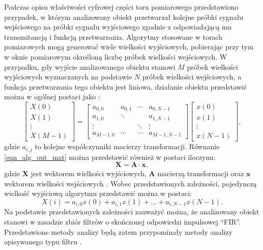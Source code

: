 Podczas opisu właściwości cyfrowej części toru pomiarowego przedstawiono przypadek, w którym analizowany obiekt przetwarzał kolejne próbki sygnału wejściowego na próbki sygnału wyjściowego zgodnie z odpowiadającą mu transmitancją i funkcją przetwarzania. Algorytmy stosowane w torach pomiarowych mogą generować wiele wielkości wyjściowych, pobierając przy tym w oknie pomiarowym określoną liczbę próbek wielkości wejściowych. W przypadku, gdy wyjście analizowanego obiektu stanowi $M$ próbek wielkości wyjściowych wyznaczanych na podstawie $N$ próbek wielkości wejściowych, a funkcja przetwarzania tego obiektu jest liniowa, działanie obiektu przedstawić można w ogólnej postaci jako \cite{jakubiec_algorithms, jakubiec_single}:
\begin{equation}
\begin{bmatrix}
X \left( 0 \right)   \\
X \left( 1 \right)   \\
\vdots               \\
X \left( M-1 \right)
\end{bmatrix}
=
\begin{bmatrix}
a_{0, 0}   &   a_{0, 1} &   \cdots   &   a_{0, N-1}      \\
a_{1, 0}   &   \ddots   &            &   a_{1, N-1}      \\
\vdots     &            &   \ddots   &   \vdots          \\
a_{M-1, 0} &   \cdots   &   \cdots   &   a_{M-1, N-1}
\end{bmatrix}
\begin{bmatrix}
x \left( 0 \right)   \\
x \left( 1 \right)   \\
\vdots               \\
x \left( N-1 \right)
\end{bmatrix}
\label{eqn_alg_out_mat},
\end{equation}
gdzie $a_{i,j}$ to kolejne współczynniki macierzy transformacji. Równanie \eqref{eqn_alg_out_mat} można przedstawić również w postaci iloczynu:
\begin{equation}
\mathbf{X} = \mathbf{A} \cdot \mathbf{x} \label{eqn_alg_out_mul},
\end{equation}
gdzie $\mathbf{X}$ jest wektorem wielkości wyjściowych, $\mathbf{A}$ macierzą transformacji oraz $\mathbf{x}$ wektorem wielkości wejściowych \cite{jakubiec_algorithms}. Wobec przedstawionych zależności, pojedynczą wielkość wyjściową algorytmu przedstawić można w postaci:
\begin{equation}
X \left( i \right) = a_{i, 0} x \left( 0 \right) + a_{i, 1} x \left( 1 \right) + \hdots + a_{i, N-1} x \left( N-1 \right) \label{eqn_alg_out_single}.
\end{equation}
Na podstawie przedstawionych zależności zauważyć można, że analizowany obiekt stanowi w zasadzie zbiór filtrów o skończonej odpowiedzi impulsowej \enquote{FIR}. Przedstawione metody analizy będą zatem przypominały metody analizy opisywanego typu filtru \cite{mehrnia_fir}.


